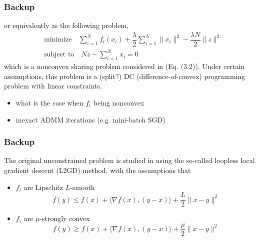 \begin{frame}
\frametitle{Backup}

or equivalently as the following problem,
\begin{align*}
    & \text{minimize} \quad \sum\limits_{i=1}^N f_i(x_i) + \dfrac{\lambda}{2} \sum\limits_{i=1}^N \lVert x_i \rVert^2 -\dfrac{\lambda N}{2} \lVert z \rVert^2 \\
    & \text{subject to} \quad Nz - \sum\limits_{i=1}^N x_i = 0
\end{align*}
which is a nonconvex sharing problem considered in \cite{hong2016convergence} (Eq. (3.2)). Under certain assumptions, this problem is a (split?) DC (difference-of-convex) programming problem with linear constraints.

\begin{question}
\begin{itemize}
    \item what is the case when $f_i$ being nonconvex
    \item inexact ADMM iterations (e.g. mini-batch SGD)
\end{itemize}
\end{question}

\end{frame}


\begin{frame}
\frametitle{Backup}

The original unconstrained problem is studied in \cite{hanzely2020federated} using the so-called loopless local gradient descent (L2GD) method, with the assumptions that
\begin{itemize}
    \item $f_i$ are Lipschitz $L$-smooth
    $$f(y) \leqslant f(x) + \langle \nabla f(x), (y-x)\rangle + \dfrac{L}{2} \lVert x-y \rVert^2$$
    \item $f_i$ are $\mu$-strongly convex
    $$f(y) \geqslant f(x) + \langle \nabla f(x), (y-x)\rangle + \dfrac{\mu}{2} \lVert x-y \rVert^2$$
\end{itemize}

\end{frame}


